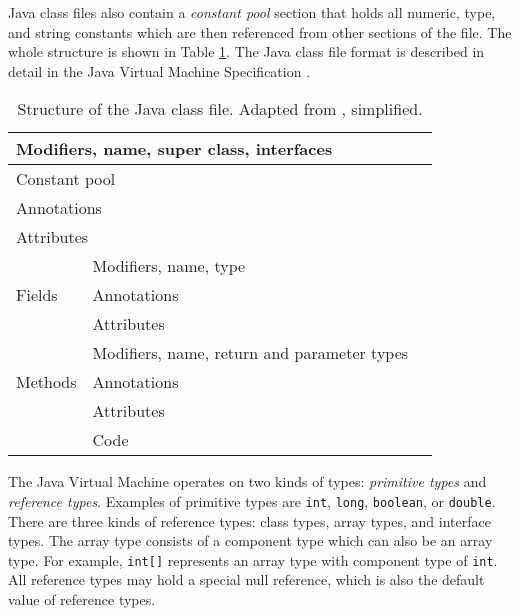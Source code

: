 Java class files also contain a \emph{constant pool} section that holds all
numeric, type, and string constants which are then referenced from other
sections of the file. The whole structure is shown in Table \ref{classfile}.
The Java class file format is described in detail in the Java Virtual Machine
Specification \cite{jvmspec}.

\begin{table}
    \begin{center}
        \label{classfile}
        \begin{tabular}{|l|l|l|}
            \hline
            \multicolumn{2}{|l|}{Modifiers, name, super class, interfaces} \\
            \hline
            \multicolumn{2}{|l|}{Constant pool} \\
            \hline
            \multicolumn{2}{|l|}{Annotations} \\
            \hline
            \multicolumn{2}{|l|}{Attributes} \\
            \hline
            \multirow{3}{*}{Fields} & Modifiers, name, type \\
            & Annotations \\
            & Attributes \\
            \hline
            \multirow{3}{*}{Methods} & Modifiers, name, return and parameter types \\
            & Annotations \\
            & Attributes \\
            & Code \\
            \hline
        \end{tabular}
        \caption{Structure of the Java class file. Adapted from \cite{asmguide},
        simplified.}
    \end{center}
\end{table}

The Java Virtual Machine operates on two kinds of types: \emph{primitive types}
and \emph{reference types}. Examples of primitive types are \texttt{int},
\texttt{long}, \texttt{boolean}, or \texttt{double}. There are three kinds of
reference types: class types, array types, and interface types. The array type
consists of a component type which can also be an array type. For example,
\texttt{int[]} represents an array type with component type of \texttt{int}. All
reference types may hold a special null reference, which is also the default
value of reference types.

